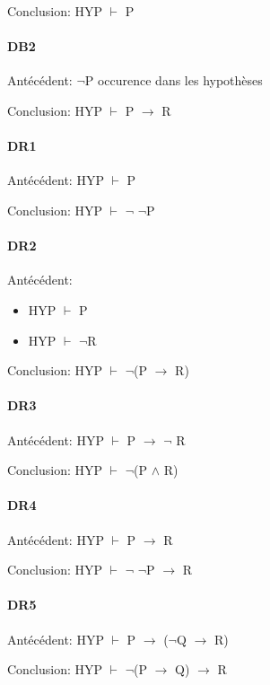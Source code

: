 \documentclass[a4paper,12pt]{article}
\begin{document}
Conclusion:  HYP $\vdash$ P

\paragraph{DB2}

Antécédent: $\neg$P occurence dans les hypothèses

Conclusion: HYP $\vdash$ P $\rightarrow$ R

\paragraph{DR1}

Antécédent:  HYP $\vdash$ P

Conclusion:  HYP $\vdash$ $\neg$ $\neg$P


\paragraph{DR2}

Antécédent: \begin{itemize}
             \item HYP $\vdash$ P
             \item HYP $\vdash$ $\neg$R
            \end{itemize}

Conclusion:  HYP $\vdash$ $\neg$(P $\rightarrow$ R)

\paragraph{DR3}

Antécédent: HYP $\vdash$ P $\rightarrow$ $\neg$ R

Conclusion: HYP $\vdash$ $\neg$(P $\wedge$ R)

\paragraph{DR4}

Antécédent: HYP $\vdash$ P $\rightarrow$ R

Conclusion: HYP $\vdash$ $\neg$ $\neg$P $\rightarrow$ R

\paragraph{DR5}

Antécédent:  HYP $\vdash$ P $\rightarrow$ ($\neg$Q $\rightarrow$ R)

Conclusion: HYP $\vdash$ $\neg$(P $\rightarrow$ Q) $\rightarrow$ R
\end{document}
